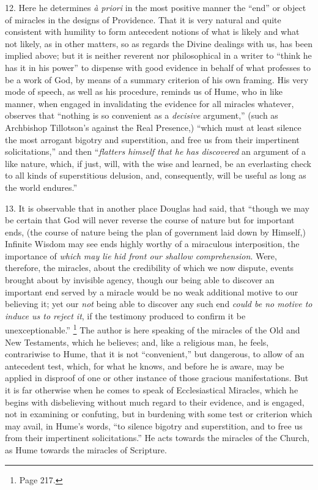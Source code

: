 12.
Here he determines \emph{à priori} in the most positive manner the ``end'' or object of miracles in the designs of Providence. That it
is very natural and quite consistent with humility to form antecedent
notions of what is likely and what not likely, as in other matters, so
as regards the Divine dealings with us, has been implied above; but it
is neither reverent nor philosophical in a writer to ``think he
has it in his power'' to dispense with good evidence in behalf of
what professes to be a work of God, by means of a summary criterion of
his own framing. His very mode of speech, as well as his procedure,
reminds us of Hume, who in like manner, when engaged in invalidating
the evidence for all miracles whatever, observes that ``nothing is so
convenient as a \emph{decisive} argument,'' (such as Archbishop
Tillotson's against the Real Presence,) ``which must at least
silence the most arrogant bigotry and superstition, and free us from
their impertinent solicitations,'' and then ``\emph{flatters himself
that he has discovered} an argument of a like nature, which, if
just, will, with the wise and learned, be an everlasting check to all
kinds of superstitious delusion, and, consequently, will be useful as
long as the world endures.''

13.
It is observable that in another place Douglas had said, that ``though we may be certain that God will never reverse the course of
nature but for important ends, (the course of nature being the plan of
government laid down by Himself,) Infinite Wisdom may see ends highly
worthy of a miraculous interposition, the importance of \emph{which may
lie hid front our shallow comprehension}. Were, therefore, the
miracles, about the credibility of which we now dispute, events
brought about by invisible agency, though our being able to discover
an important end served by a miracle would be no weak additional
motive to our believing it; yet our \emph{not} being able to discover
any such end \emph{could be no motive to induce us to reject it}, if
the testimony produced to confirm it be unexceptionable.'' \footnote{Page 217.} The author is here speaking of the miracles of the Old and New
Testaments, which he believes; and, like a religious man, he feels,
contrariwise to Hume, that it is not ``convenient,'' but dangerous,
to allow of an antecedent test, which, for what he knows, and before
he is aware, may be applied in disproof of one or other instance of
those gracious manifestations. But it is far otherwise when he comes
to speak of Ecclesiastical Miracles, which he begins with disbelieving
without much regard to their evidence, and is engaged, not in
examining or confuting, but in burdening with some test or criterion
which may avail, in Hume's words, ``to silence bigotry and
superstition, and to free us from their impertinent solicitations.''
He acts towards the miracles of the Church, as Hume towards the
miracles of Scripture.

